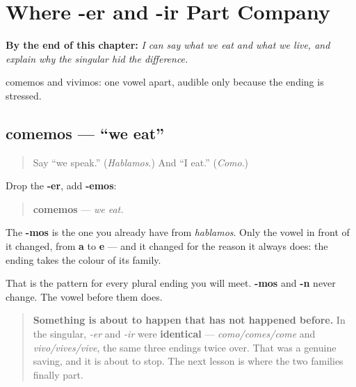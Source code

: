 
\chapter{Where -er and -ir Part Company}
\label{ch:spanish-er-ir-1pl}

\begin{chapteropening}
\textbf{By the end of this chapter:} \emph{I can say what we eat and what we live, and explain why the singular hid the difference.}

comemos and vivimos: one vowel apart, audible only because the ending is stressed.
\end{chapteropening}

\section[comemos]{comemos — \textquotedblleft{}we eat\textquotedblright{}}

\label{lesson:ES-C07-comemos}



\begin{quote}
Say \textquotedblleft{}we speak.\textquotedblright{} (\emph{Hablamos}.) And \textquotedblleft{}I eat.\textquotedblright{} (\emph{Como}.)
\end{quote}

\begin{grammarlens}[title={Grammar Lens: the same -mos, a different vowel}]
Drop the \textbf{-er}, add \textbf{-emos}:

\begin{quote}
\textbf{comemos} — \emph{we eat.}
\end{quote}

The \textbf{-mos} is the one you already have from \emph{hablamos}. Only the vowel in front of it changed, from \textbf{a} to \textbf{e} — and it changed for the reason it always does: the ending takes the colour of its family.

That is the pattern for every plural ending you will meet. \textbf{-mos} and \textbf{-n} never change. The vowel before them does.

\begin{quote}
\textbf{Something is about to happen that has not happened before.} In the singular, \emph{-er} and \emph{-ir} were \textbf{identical} — \emph{como/comes/come} and \emph{vivo/vives/vive}, the same three endings twice over. That was a genuine saving, and it is about to stop. The next lesson is where the two families finally part.
\end{quote}
\end{grammarlens}

